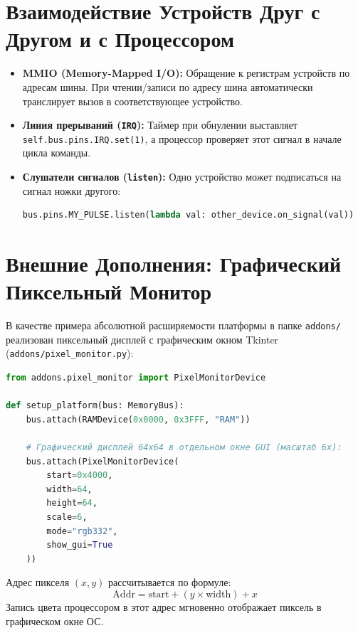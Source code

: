 \documentclass[11pt,a4paper]{article}
\begin{document}
\section{Взаимодействие Устройств Друг с Другом и с Процессором}

\begin{itemize}
    \item \textbf{MMIO (Memory-Mapped I/O):} Обращение к регистрам устройств по адресам шины. При чтении/записи по адресу шина автоматически транслирует вызов в соответствующее устройство.
    \item \textbf{Линия прерываний (\texttt{IRQ}):} Таймер при обнулении выставляет \texttt{self.bus.pins.IRQ.set(1)}, а процессор проверяет этот сигнал в начале цикла команды.
    \item \textbf{Слушатели сигналов (\texttt{listen}):} Одно устройство может подписаться на сигнал ножки другого:
    \begin{lstlisting}[language=Python]
    bus.pins.MY_PULSE.listen(lambda val: other_device.on_signal(val))
    \end{lstlisting}
\end{itemize}

\section{Внешние Дополнения: Графический Пиксельный Монитор}

В качестве примера абсолютной расширяемости платформы в папке \texttt{addons/} реализован пиксельный дисплей с графическим окном Tkinter (\texttt{addons/pixel\_monitor.py}):

\begin{lstlisting}[language=Python, caption={Подключение пиксельного монитора в sim.py}]
from addons.pixel_monitor import PixelMonitorDevice

def setup_platform(bus: MemoryBus):
    bus.attach(RAMDevice(0x0000, 0x3FFF, "RAM"))

    # Графический дисплей 64x64 в отдельном окне GUI (масштаб 6x):
    bus.attach(PixelMonitorDevice(
        start=0x4000,
        width=64,
        height=64,
        scale=6,
        mode="rgb332",
        show_gui=True
    ))
\end{lstlisting}

Адрес пикселя $(x, y)$ рассчитывается по формуле:
$$\text{Addr} = \text{start} + (y \times \text{width}) + x$$
Запись цвета процессором в этот адрес мгновенно отображает пиксель в графическом окне ОС.
\end{document}

